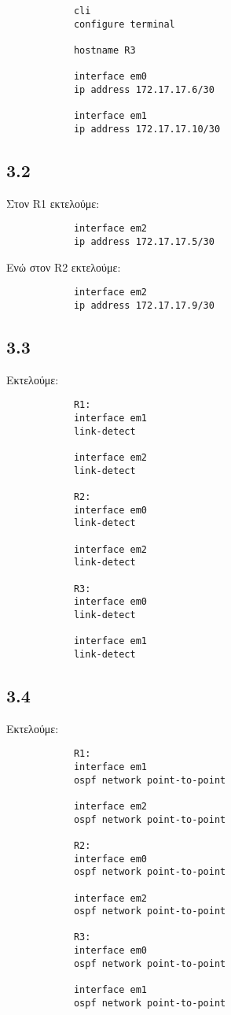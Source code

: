 \documentclass[a4paper, 12pt]{article}
\begin{document}
		\begin{verbatim}
			cli
			configure terminal
			
			hostname R3
			
			interface em0
			ip address 172.17.17.6/30
			
			interface em1
			ip address 172.17.17.10/30
		\end{verbatim}

	\subsection*{3.2}
		Στον R1 εκτελούμε:
		
		\begin{verbatim}
			interface em2
			ip address 172.17.17.5/30
		\end{verbatim}
		
		Ενώ στον R2 εκτελούμε:
		
		\begin{verbatim}
			interface em2
			ip address 172.17.17.9/30
		\end{verbatim}

	\subsection*{3.3}
		Εκτελούμε:
		
		\begin{verbatim}
			R1:			
			interface em1
			link-detect
			
			interface em2
			link-detect
			
			R2:			
			interface em0
			link-detect
			
			interface em2
			link-detect
			
			R3:
			interface em0
			link-detect
			
			interface em1
			link-detect
		\end{verbatim}

	\subsection*{3.4}
		Εκτελούμε:
		
		\begin{verbatim}
			R1:
			interface em1
			ospf network point-to-point
			
			interface em2
			ospf network point-to-point
			
			R2:
			interface em0
			ospf network point-to-point
			
			interface em2
			ospf network point-to-point
			
			R3:
			interface em0
			ospf network point-to-point
			
			interface em1
			ospf network point-to-point
		\end{verbatim}
\end{document}
